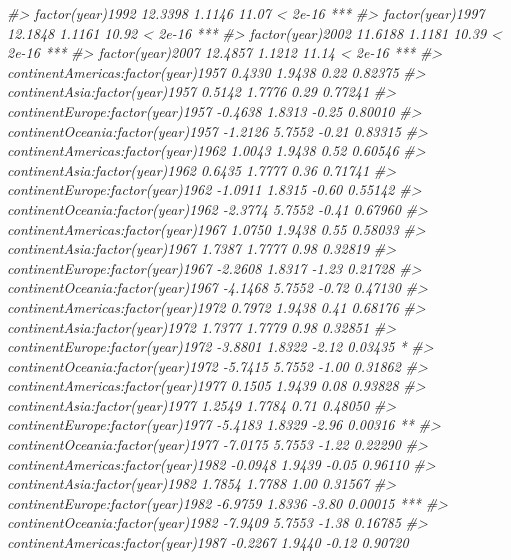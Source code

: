 \documentclass[]{book}
\newenvironment{Shaded}{\begin{snugshade}}{\end{snugshade}}
\newcommand{\CommentTok}[1]{\textcolor[rgb]{0.56,0.35,0.01}{\textit{#1}}}
\begin{document}
\begin{Shaded}
\begin{Highlighting}[]
\CommentTok{#> factor(year)1992                    12.3398     1.1146   11.07  < 2e-16 ***}
\CommentTok{#> factor(year)1997                    12.1848     1.1161   10.92  < 2e-16 ***}
\CommentTok{#> factor(year)2002                    11.6188     1.1181   10.39  < 2e-16 ***}
\CommentTok{#> factor(year)2007                    12.4857     1.1212   11.14  < 2e-16 ***}
\CommentTok{#> continentAmericas:factor(year)1957   0.4330     1.9438    0.22  0.82375    }
\CommentTok{#> continentAsia:factor(year)1957       0.5142     1.7776    0.29  0.77241    }
\CommentTok{#> continentEurope:factor(year)1957    -0.4638     1.8313   -0.25  0.80010    }
\CommentTok{#> continentOceania:factor(year)1957   -1.2126     5.7552   -0.21  0.83315    }
\CommentTok{#> continentAmericas:factor(year)1962   1.0043     1.9438    0.52  0.60546    }
\CommentTok{#> continentAsia:factor(year)1962       0.6435     1.7777    0.36  0.71741    }
\CommentTok{#> continentEurope:factor(year)1962    -1.0911     1.8315   -0.60  0.55142    }
\CommentTok{#> continentOceania:factor(year)1962   -2.3774     5.7552   -0.41  0.67960    }
\CommentTok{#> continentAmericas:factor(year)1967   1.0750     1.9438    0.55  0.58033    }
\CommentTok{#> continentAsia:factor(year)1967       1.7387     1.7777    0.98  0.32819    }
\CommentTok{#> continentEurope:factor(year)1967    -2.2608     1.8317   -1.23  0.21728    }
\CommentTok{#> continentOceania:factor(year)1967   -4.1468     5.7552   -0.72  0.47130    }
\CommentTok{#> continentAmericas:factor(year)1972   0.7972     1.9438    0.41  0.68176    }
\CommentTok{#> continentAsia:factor(year)1972       1.7377     1.7779    0.98  0.32851    }
\CommentTok{#> continentEurope:factor(year)1972    -3.8801     1.8322   -2.12  0.03435 *  }
\CommentTok{#> continentOceania:factor(year)1972   -5.7415     5.7552   -1.00  0.31862    }
\CommentTok{#> continentAmericas:factor(year)1977   0.1505     1.9439    0.08  0.93828    }
\CommentTok{#> continentAsia:factor(year)1977       1.2549     1.7784    0.71  0.48050    }
\CommentTok{#> continentEurope:factor(year)1977    -5.4183     1.8329   -2.96  0.00316 ** }
\CommentTok{#> continentOceania:factor(year)1977   -7.0175     5.7553   -1.22  0.22290    }
\CommentTok{#> continentAmericas:factor(year)1982  -0.0948     1.9439   -0.05  0.96110    }
\CommentTok{#> continentAsia:factor(year)1982       1.7854     1.7788    1.00  0.31567    }
\CommentTok{#> continentEurope:factor(year)1982    -6.9759     1.8336   -3.80  0.00015 ***}
\CommentTok{#> continentOceania:factor(year)1982   -7.9409     5.7553   -1.38  0.16785    }
\CommentTok{#> continentAmericas:factor(year)1987  -0.2267     1.9440   -0.12  0.90720    }

\end{Highlighting}
\end{Shaded}
\end{document}
